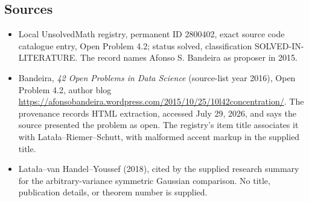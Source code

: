 \documentclass[11pt]{article}
\begin{document}
\subsection{Sources}
\begin{itemize}
\item Local UnsolvedMath registry, permanent ID 2800402, exact source code catalogue entry, Open Problem 4.2; status solved, classification SOLVED-IN-LITERATURE. The record names Afonso S. Bandeira as proposer in 2015.
\item Bandeira, \emph{42 Open Problems in Data Science} (source-list year 2016), Open Problem 4.2, author blog \url{https://afonsobandeira.wordpress.com/2015/10/25/10l42concentration/}. The provenance records HTML extraction, accessed July 29, 2026, and says the source presented the problem as open. The registry's item title associates it with Lata\l a--Riemer--Schutt, with malformed accent markup in the supplied title.
\item Lata\l a--van Handel--Youssef (2018), cited by the supplied research summary for the arbitrary-variance symmetric Gaussian comparison. No title, publication details, or theorem number is supplied.
\end{itemize}
\end{document}
